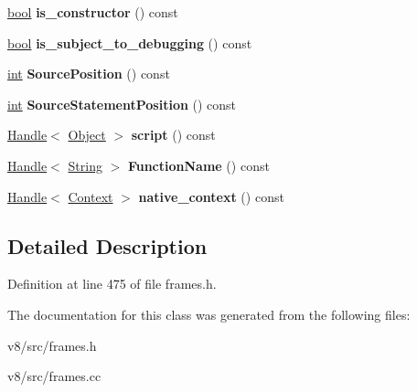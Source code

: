 \begin{DoxyCompactItemize}
\item 
\mbox{\label{classv8_1_1internal_1_1FrameSummary_1_1JavaScriptFrameSummary_a816697024e245a8cf7b08fbc52191e7e}} 
\mbox{\hyperlink{classbool}{bool}} {\bfseries is\+\_\+constructor} () const
\item 
\mbox{\label{classv8_1_1internal_1_1FrameSummary_1_1JavaScriptFrameSummary_ac988bf9257e6cfb76ef2a3c72e5d9e58}} 
\mbox{\hyperlink{classbool}{bool}} {\bfseries is\+\_\+subject\+\_\+to\+\_\+debugging} () const
\item 
\mbox{\label{classv8_1_1internal_1_1FrameSummary_1_1JavaScriptFrameSummary_a49ee8723d37c8f8f53bea3fb29aa1fa2}} 
\mbox{\hyperlink{classint}{int}} {\bfseries Source\+Position} () const
\item 
\mbox{\label{classv8_1_1internal_1_1FrameSummary_1_1JavaScriptFrameSummary_abcc998d284bb73eb0c636e6bb954f503}} 
\mbox{\hyperlink{classint}{int}} {\bfseries Source\+Statement\+Position} () const
\item 
\mbox{\label{classv8_1_1internal_1_1FrameSummary_1_1JavaScriptFrameSummary_af96c849c6a7705f8ab40addfe406cfc6}} 
\mbox{\hyperlink{classv8_1_1internal_1_1Handle}{Handle}}$<$ \mbox{\hyperlink{classv8_1_1internal_1_1Object}{Object}} $>$ {\bfseries script} () const
\item 
\mbox{\label{classv8_1_1internal_1_1FrameSummary_1_1JavaScriptFrameSummary_a16e2c75d391b868690f22a2dfa60af8e}} 
\mbox{\hyperlink{classv8_1_1internal_1_1Handle}{Handle}}$<$ \mbox{\hyperlink{classv8_1_1internal_1_1String}{String}} $>$ {\bfseries Function\+Name} () const
\item 
\mbox{\label{classv8_1_1internal_1_1FrameSummary_1_1JavaScriptFrameSummary_a2605920f02f99f3bc4341a3d36e94843}} 
\mbox{\hyperlink{classv8_1_1internal_1_1Handle}{Handle}}$<$ \mbox{\hyperlink{classv8_1_1internal_1_1Context}{Context}} $>$ {\bfseries native\+\_\+context} () const
\end{DoxyCompactItemize}


\subsection{Detailed Description}


Definition at line 475 of file frames.\+h.



The documentation for this class was generated from the following files\+:\begin{DoxyCompactItemize}
\item 
v8/src/frames.\+h\item 
v8/src/frames.\+cc\end{DoxyCompactItemize}
